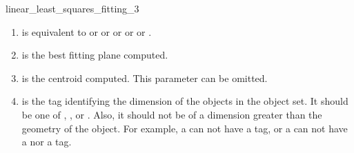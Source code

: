 \begin{ccRefFunction}{linear_least_squares_fitting_3}
\begin{enumerate}
   \item  {} is equivalent to  or
           or  or  or
           or .
   \item  {} is the best fitting plane computed.
   \item  {} is the centroid computed. This parameter can be
          omitted.
   \item  {} is the tag identifying the dimension of the objects in the object set. It should be one of , ,  or . Also, it should not be of a dimension greater than the geometry of the object. For example, a  can not have a  tag, or a  can not have a  nor a  tag.
\end{enumerate}

\end{ccRefFunction}

